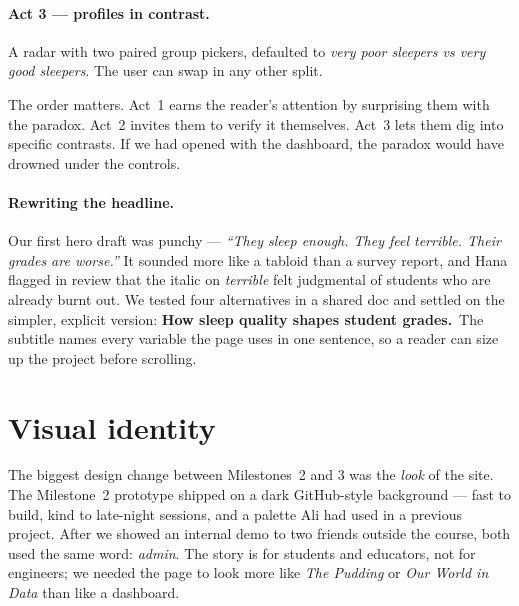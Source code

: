\documentclass[11pt,a4paper]{article}
\newcommand{\acc}[1]{\textcolor{brand}{\textbf{#1}}}
\begin{document}
\paragraph{Act 3 — profiles in contrast.} A radar with two paired group pickers, defaulted to \emph{very poor sleepers vs very good sleepers}. The user can swap in any other split.

The order matters. Act~1 earns the reader's attention by surprising them with the paradox. Act~2 invites them to verify it themselves. Act~3 lets them dig into specific contrasts. If we had opened with the dashboard, the paradox would have drowned under the controls.

\paragraph{Rewriting the headline.} Our first hero draft was punchy — \emph{``They sleep enough. They feel terrible. Their grades are worse.''} It sounded more like a tabloid than a survey report, and Hana flagged in review that the italic on \emph{terrible} felt judgmental of students who are already burnt out. We tested four alternatives in a shared doc and settled on the simpler, explicit version: \acc{How sleep quality shapes student grades.}\ The subtitle names every variable the page uses in one sentence, so a reader can size up the project before scrolling.

\section{Visual identity}
\label{sec:visual}

The biggest design change between Milestones~2 and 3 was the \emph{look} of the site. The Milestone~2 prototype shipped on a dark GitHub-style background — fast to build, kind to late-night sessions, and a palette Ali had used in a previous project. After we showed an internal demo to two friends outside the course, both used the same word: \emph{admin}. The story is for students and educators, not for engineers; we needed the page to look more like \emph{The Pudding} or \emph{Our World in Data} than like a dashboard.

\begin{center}
\end{center}
\vspace{0.6em}
\end{document}
